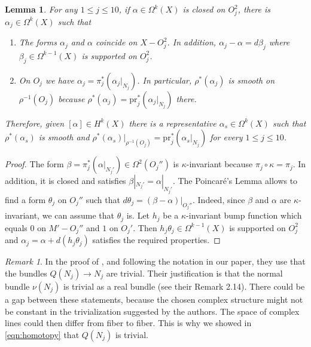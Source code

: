 \documentclass[10pt]{article}
\theoremstyle{plain}
\newtheorem{lem}[proposition]{Lemma}
\theoremstyle{definition}
\theoremstyle{remark}
\newtheorem{remark}{Remark}
\begin{document}
\begin{lem} \label{lem:smothness}
For any $1\leq j \leq 10$, if $\alpha \in \Omega^k(X)$ is closed on $O_j^2$, there is $\alpha_j \in \Omega^k(X)$ such that
\begin{enumerate}
    \item The forms $\alpha_j$ and $\alpha$ coincide on $X-O_j^2$. In addition, 
    $\alpha_j - \alpha=d\beta_j$ where $\beta_j \in \Omega^{k-1}(X)$ is supported on $O_j^2$.
    \item On $O_j$ we have $\alpha_j = \pi_j^*(\alpha_j|_{N_j})$. In particular, $\rho^*(\alpha_j)$ is smooth on $\rho^{-1}(O_j)$ because $\rho^*(\alpha_j)= \mathrm{pr}_j^*(\alpha_j|_{N_j})$ there.
\end{enumerate}
Therefore, given $[\alpha]\in H^k(X)$ there is a representative $\alpha_s \in \Omega^k(X)$ such that  $\rho^*(\alpha_s)$ is smooth and
 $\rho^*(\alpha_s)|_{\rho^{-1}(O_j)}=\mathrm{pr}_j^*(\alpha_s|_{N_j})$ for every $1\leq j \leq 10$.
\end{lem}
\begin{proof} 
The form $\beta=\pi_j^{*}(\alpha|_{N_j'})\in \Omega^2(O_j'')$ is $\kappa$-invariant because $\pi_j \circ \kappa= \pi_j$. In addition, it is closed and satisfies $\beta|_{N_j'}=\alpha|_{N_j'}$.  The Poincaré's Lemma allows to find a form $\theta_j$ on $O_j''$ such that $d\theta_j= (\beta - \alpha)|_{O_j''}$. 
Indeed, since $\beta$ and $\alpha$ are $\kappa$-invariant, we can assume that $\theta_j$ is. Let $h_j$ be a $\kappa$-invariant bump function which equals $0$ on $M'-O_j''$ and $1$ on $O_j'$. Then $h_j \theta_j\in \Omega^{k-1}(X)$ is supported on $O_j^2$ and 
$
\alpha_j= \alpha + d(h_j \theta_j)
$
satisfies the required properties.
\end{proof}

 \begin{remark}
In the proof of 
 \cite[Proposition 6.1]{JK}, and following the notation in our paper, they use 
that the bundles $Q(N_j)\to N_j$ are trivial. Their justification is that the normal bundle $\nu(N_j)$ is trivial as a real bundle (see their Remark 2.14). There could be a gap between these statements, because the chosen complex structure might not be constant in the trivialization suggested by the authors. The space of complex lines could then differ from fiber to fiber. This is why we showed in \eqref{eqn:homotopy} that $Q(N_j)$ is trivial.
 \end{remark}
\end{document}
